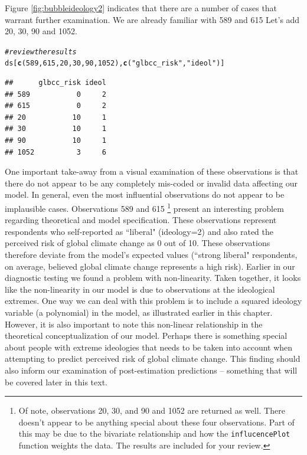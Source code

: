 \documentclass[11pt,openany]{book}\usepackage[]{graphicx}\usepackage[]{color}
\makeatletter
\newcommand{\hlnum}[1]{\textcolor[rgb]{0.686,0.059,0.569}{#1}}%
\newcommand{\hlstr}[1]{\textcolor[rgb]{0.192,0.494,0.8}{#1}}%
\newcommand{\hlcom}[1]{\textcolor[rgb]{0.678,0.584,0.686}{\textit{#1}}}%
\newcommand{\hlstd}[1]{\textcolor[rgb]{0.345,0.345,0.345}{#1}}%
\newcommand{\hlkwd}[1]{\textcolor[rgb]{0.737,0.353,0.396}{\textbf{#1}}}%
\newenvironment{kframe}{%
 \def\at@end@of@kframe{}%
 \ifinner\ifhmode%
  \def\at@end@of@kframe{\end{minipage}}%
  \begin{minipage}{\columnwidth}%
 \fi\fi%
 \def\FrameCommand##1{\hskip\@totalleftmargin \hskip-\fboxsep
 \colorbox{shadecolor}{##1}\hskip-\fboxsep
     \hskip-\linewidth \hskip-\@totalleftmargin \hskip\columnwidth}%
 \MakeFramed {\advance\hsize-\width
   \@totalleftmargin\z@ \linewidth\hsize
   \@setminipage}}%
 {\par\unskip\endMakeFramed%
 \at@end@of@kframe}
\newenvironment{knitrout}{}{} %
\renewenvironment{knitrout}{\begin{singlespace}}{\end{singlespace}} %
\makeatother
\begin{document}
\noindent Figure \ref{fig:bubbleideology2} indicates that there are a number of cases that warrant further examination.  We are already familiar with 589 and 615  Let's add 20, 30, 90 and 1052.

\begin{knitrout}
\color{fgcolor}\begin{kframe}
\begin{alltt}
\hlcom{# review the results}
\hlstd{ds[}\hlkwd{c}\hlstd{(}\hlnum{589}\hlstd{,} \hlnum{615}\hlstd{,} \hlnum{20}\hlstd{,} \hlnum{30}\hlstd{,} \hlnum{90}\hlstd{,} \hlnum{1052}\hlstd{),} \hlkwd{c}\hlstd{(}\hlstr{"glbcc_risk"}\hlstd{,} \hlstr{"ideol"}\hlstd{)]}
\end{alltt}
\begin{verbatim}
##      glbcc_risk ideol
## 589           0     2
## 615           0     2
## 20           10     1
## 30           10     1
## 90           10     1
## 1052          3     6
\end{verbatim}
\end{kframe}
\end{knitrout}

One important take-away from a visual examination of these observations is that there do not appear to be any completely mis-coded or invalid data affecting our model. In general, even the most influential observations do not appear to be implausible cases.  Observations 589 and 615 \footnote{Of note, observations 20, 30, and 90 and 1052 are returned as well.  There doesn't appear to be anything special about these four observations.  Part of this may be due to the bivariate relationship and how the \texttt{influcencePlot} function weights the data.  The results are included for your review.} present an interesting problem regarding  theoretical and model specification. These observations represent respondents who self-reported as  ``liberal" (ideology=2) and also rated the perceived risk of global climate change as 0 out of 10. These observations therefore deviate from the model's expected values (``strong liberal" respondents, on average, believed global climate change represents a high risk).  Earlier in our diagnostic testing we found a problem with non-linearity. Taken together, it looks like the non-linearity in our model is due to observations at the ideological extremes.  One way we can deal with this problem is to include a squared ideology variable (a polynomial) in the model, as illustrated earlier in this chapter. However, it is also important to note this non-linear relationship in the theoretical conceptualization of our model. Perhaps there is something special about people with extreme ideologies that needs to be taken into account when attempting to predict perceived risk of global climate change. This finding should also inform our examination of post-estimation predictions -- something that will be covered later in this text.
\end{document}
